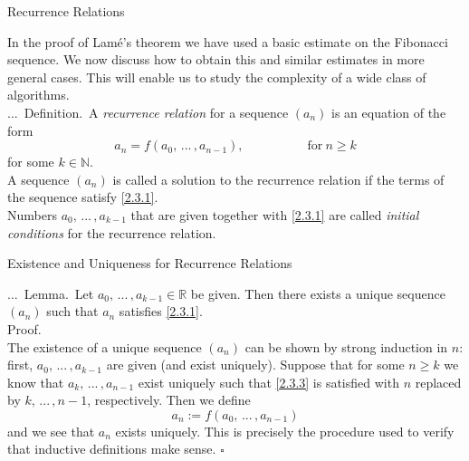 \documentclass[smaller,hyperref={CJKbookmarks=true}]{beamer}
\newcommand{\N}{\mathbb{N}} \newcommand{\Z}{\mathbb{Z}} \newcommand{\Q}{\mathbb{Q}}
\newcommand{\R}{\mathbb{R}}
\newenvironment{PROOF}{{\noindent\!\sf\alert{Proof.}}\\}{\hfill$\square$\\}
\newcounter{zhuo}[subsection]
\renewcommand{\thezhuo}{\thesection.\thesubsection.\arabic{zhuo}}
\newenvironment{DEFINITION}{\stepcounter{zhuo}\alert{\thezhuo.~Definition.\,}}{}
\newenvironment{LEMMA}{\stepcounter{zhuo}\alert{\thezhuo.~Lemma.\,}}{}
\begin{document}
\begin{frame}[t]{Recurrence Relations}
\begin{spacing}{1.1}
In the proof of Lam\'{e}'s theorem we have used a basic estimate on the
Fibonacci sequence. We now discuss how to obtain this and similar
estimates in more general cases. This will enable us to study the
complexity of a wide class of algorithms.\\[5pt]
\begin{DEFINITION}
A \emph{recurrence relation} for a sequence $(a_n)$ is an equation of the form
\setcounter{equation}{0}
\begin{equation}\label{2.3.1}
a_n=f(a_0,\,...\,,a_{n-1}),\qquad\qquad\quad
\text{for}~n\geq k
\end{equation}
for some $k\in\N$.\\[5pt]
A sequence $(a_n)$ is called a solution to the recurrence relation if the terms
of the sequence satisfy \eqref{2.3.1}.\\[5pt]
Numbers $a_0,\,...\,,a_{k-1}$ that are given together with \eqref{2.3.1} are called \emph{initial conditions} for the recurrence relation.
\end{DEFINITION}
\end{spacing}
\end{frame}
\begin{frame}[c]{Existence and Uniqueness for Recurrence Relations}
\begin{spacing}{1.1}
\begin{LEMMA}
Let $a_0,\,...\,,a_{k-1}\in\R$ be given. Then there exists a unique sequence $(a_n)$ such that $a_n$ satisfies \eqref{2.3.1}.\\[6pt]
\end{LEMMA}
\begin{PROOF}
The existence of a unique sequence $(a_n)$ can be shown by strong induction in $n$: first, $a_0,\,...\,,a_{k-1}$ are given (and exist uniquely). Suppose that for some $n\geq k$ we know that $a_k,\,...\,,a_{n-1}$ exist uniquely such that \eqref{2.3.3} is satisfied with $n$ replaced by $k,\,...\,,n-1$, respectively. Then we define
\[a_n:=f(a_0,\,...\,,a_{n-1})\]
and we see that $a_n$ exists uniquely. This is precisely the procedure used to
verify that inductive definitions make sense.
\end{PROOF}
\end{spacing}
\end{frame}
\end{document}
